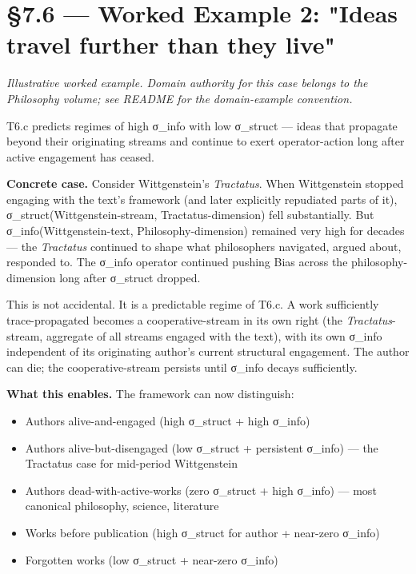 \documentclass[11pt, openany]{book}
\newcommand{\sectionbreak}{\clearpage}
\begin{document}
\sectionbreak

\section{§7.6 --- Worked Example 2: "Ideas travel further than they live"}

\textit{Illustrative worked example. Domain authority for this case belongs to the Philosophy volume; see README for the domain-example convention.}

T6.c predicts regimes of high σ\_\allowbreak{}info with low σ\_\allowbreak{}struct --- ideas that propagate beyond their originating streams and continue to exert operator-action long after active engagement has ceased.

\textbf{Concrete case.} Consider Wittgenstein's \textit{Tractatus}. When Wittgenstein stopped engaging with the text's framework (and later explicitly repudiated parts of it), σ\_\allowbreak{}struct(Wittgenstein-stream, Tractatus-dimension) fell substantially. But σ\_\allowbreak{}info(Wittgenstein-text, Philosophy-dimension) remained very high for decades --- the \textit{Tractatus} continued to shape what philosophers navigated, argued about, responded to. The σ\_\allowbreak{}info operator continued pushing Bias across the philosophy-dimension long after σ\_\allowbreak{}struct dropped.

This is not accidental. It is a predictable regime of T6.c. A work sufficiently trace-propagated becomes a cooperative-stream in its own right (the \textit{Tractatus}-stream, aggregate of all streams engaged with the text), with its own σ\_\allowbreak{}info independent of its originating author's current structural engagement. The author can die; the cooperative-stream persists until σ\_\allowbreak{}info decays sufficiently.

\textbf{What this enables.} The framework can now distinguish:
\begin{itemize}
\item Authors alive-and-engaged (high σ\_\allowbreak{}struct + high σ\_\allowbreak{}info)
\item Authors alive-but-disengaged (low σ\_\allowbreak{}struct + persistent σ\_\allowbreak{}info) --- the Tractatus case for mid-period Wittgenstein
\item Authors dead-with-active-works (zero σ\_\allowbreak{}struct + high σ\_\allowbreak{}info) --- most canonical philosophy, science, literature
\item Works before publication (high σ\_\allowbreak{}struct for author + near-zero σ\_\allowbreak{}info)
\item Forgotten works (low σ\_\allowbreak{}struct + near-zero σ\_\allowbreak{}info)
\end{itemize}
\end{document}

